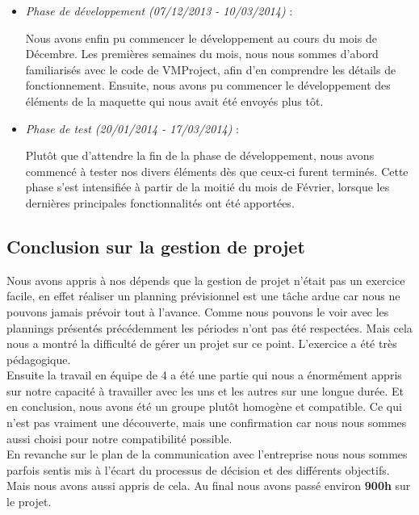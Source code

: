 \documentclass[12pt]{report}
\begin{document}
\begin{itemize}
\item \emph{Phase de développement (07/12/2013 - 10/03/2014)} :

Nous avons enfin pu commencer le développement au cours du mois de Décembre. Les premières semaines du mois, nous nous sommes d’abord familiarisés avec le code de VMProject, afin d’en comprendre les détails de fonctionnement. Ensuite, nous avons pu commencer le développement des éléments de la maquette qui nous avait été envoyés plus tôt.\\

\item \emph{Phase de test (20/01/2014 - 17/03/2014)} :

Plutôt que d'attendre la fin de la phase de développement, nous avons commencé à tester nos divers éléments dès que ceux-ci furent terminés. Cette phase s'est intensifiée à partir de la moitié du mois de Février, lorsque les dernières principales fonctionnalités ont été apportées.\\
\end{itemize}

	\subsection{Conclusion sur la gestion de projet}
	
	Nous avons appris à nos dépends que la gestion de projet n'était pas un exercice facile, en effet réaliser un planning prévisionnel est une tâche ardue car nous ne pouvons jamais prévoir tout à l'avance. Comme nous pouvons le voir avec les plannings présentés précédemment les périodes n'ont pas été respectées. Mais cela nous a montré la difficulté de gérer un projet sur ce point. L'exercice a été très pédagogique.\\
	
	Ensuite la travail en équipe de 4 a été une partie qui nous a énormément appris sur notre capacité à travailler avec les uns et les autres sur une longue durée. Et en conclusion, nous avons été un groupe plutôt homogène et compatible. Ce qui n'est pas vraiment une découverte, mais une confirmation car nous nous sommes aussi choisi pour notre compatibilité possible.\\
	
	En revanche sur le plan de la communication avec l'entreprise nous nous sommes parfois sentis mis à l'écart du processus de décision et des différents objectifs. Mais nous avons aussi appris de cela. Au final nous avons passé environ \textbf{900h} sur le projet.\\
\end{document}
